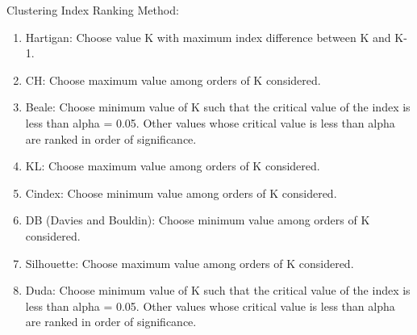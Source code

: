 \documentclass[twoside,12pt,final]{ucthesis-CA2012}
\providecommand{\tightlist}{%
  \setlength{\itemsep}{0pt}\setlength{\parskip}{0pt}}
\begin{document}
\begin{ucmainmatter}
Clustering Index Ranking Method:
\begin{enumerate}
\def\labelenumi{\arabic{enumi}.}
\tightlist
\item
  Hartigan: Choose value K with maximum index difference between K and K-1.
\item
  CH: Choose maximum value among orders of K considered.
\item
  Beale: Choose minimum value of K such that the critical value of the index is less than alpha = 0.05. Other values whose critical value is less than alpha are ranked in order of significance.
\item
  KL: Choose maximum value among orders of K considered.
\item
  Cindex: Choose minimum value among orders of K considered.
\item
  DB (Davies and Bouldin): Choose minimum value among orders of K considered.
\item
  Silhouette: Choose maximum value among orders of K considered.
\item
  Duda: Choose minimum value of K such that the critical value of the index is less than alpha = 0.05. Other values whose critical value is less than alpha are ranked in order of significance.
\end{enumerate}
\pagebreak
\begin{table}[ht]
\centering
{}
\caption{Contingency table of observed transitions between state assignments between 2008-2018. For each plot observation of a state assignment in year t (rows), data shows the frequency of state assignments (columns) of the same plot in a subsequent year (t + 1). Diagonal values represent the frequency of a given state retaining its assignment (persistence), while off-diagonal values represent transitions in state assignment. Changes in assignment frequency were highly non-random ($\chi^2$ = 392.017, df = 9, P < 0.001).} 
\end{table}

\end{ucmainmatter}
\end{document}
